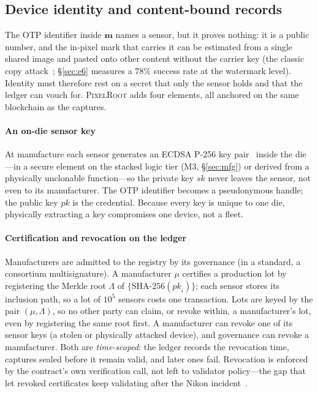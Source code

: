 \documentclass[journal]{IEEEtran}
\newcommand{\pr}{\textup{\textsc{PixelRoot}}}
\begin{document}
\fi
\subsection{Device identity and content-bound records}\label{sec:identity}
The OTP identifier inside $\mathbf{m}$ names a sensor, but it proves nothing: it
is a public number, and the in-pixel mark that carries it can be estimated from
a single shared image and pasted onto other content without the carrier key
(the classic copy attack~\cite{kutter2000copy}; \S\ref{sec:e6} measures a $78\%$
success rate at the watermark level). Identity must therefore rest on a secret
that only the sensor holds and that the ledger can vouch for. \pr{} adds four
elements, all anchored on the same blockchain as the captures.

\paragraph{An on-die sensor key}
At manufacture each sensor generates an ECDSA P-256 key pair~\cite{fips186-5}
inside the die---in a secure element on the stacked logic tier (M3,
\S\ref{sec:mfg}) or derived from a physically unclonable function---so the
private key $\mathit{sk}$ never leaves the sensor, not even to its manufacturer.
The OTP identifier becomes a pseudonymous handle; the public key $\mathit{pk}$ is
the credential. Because every key is unique to one die, physically extracting a
key compromises one device, not a fleet.

\paragraph{Certification and revocation on the ledger}
Manufacturers are admitted to the registry by its governance (in a standard, a
consortium multisignature). A manufacturer $\mu$ certifies a production lot by
registering the Merkle root $\Lambda$ of $\{\mathrm{SHA\text{-}256}(\mathit{pk}_i)\}$;
each sensor stores its inclusion path, so a lot of $10^5$ sensors costs one
transaction. Lots are keyed by the pair $(\mu,\Lambda)$, so no other party can
claim, or revoke within, a manufacturer's lot, even by registering the same root
first. A manufacturer can revoke one of its sensor keys (a stolen or physically
attacked device), and governance can revoke a manufacturer. Both are
\emph{time-scoped}: the ledger records the revocation time, captures sealed
before it remain valid, and later ones fail. Revocation is enforced by the
contract's own verification call, not left to validator policy---the gap that let
revoked certificates keep validating after the Nikon incident~\cite{c2pa2026security}.
\end{document}
